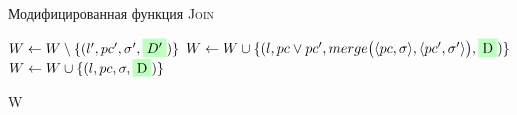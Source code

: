 \begin{algorithm}
    \caption{Модифицированная функция \textsc{Join}} \label{new_join}
\begin{algorithmic}[1]
         \label{alg:merge_start}
            \State $W \gets W \setminus \{(l',pc',\sigma',\mkGreen{$D'$})\}$
            \State $W \gets W \cup \{(l,pc \lor pc',\Merge{\pair{pc}{\sigma},\pair{pc'}{\sigma'}},\mkGreen{D})\}$
        \Else
            \State $W \gets W \cup \{(l, pc, \sigma, \mkGreen{D})\}$ \label{alg:merge_end}
        \EndIf

        \State \Return W
    \EndProcedure
\end{algorithmic}
\end{algorithm}



